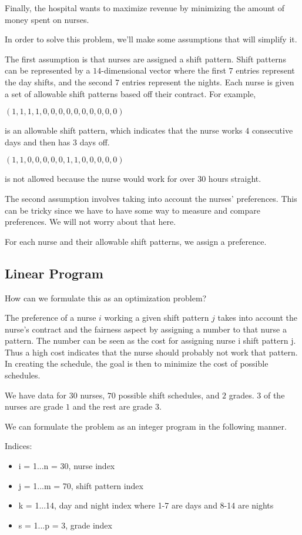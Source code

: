 Finally, the hospital wants to maximize revenue by minimizing the amount of money spent on nurses. 



In order to solve this problem, we'll make some assumptions that will simplify it. 

The first assumption is that nurses are assigned a shift pattern.
Shift patterns can be represented by a $14$-dimensional vector where the first $7$ entries represent the day shifts, and the second $7$ entries represent the nights.
Each nurse is given a set of allowable shift patterns based off their contract.
For example, 
\begin{center}
$(1,1,1,1,0,0,0,0,0,0,0,0,0,0)$
\end{center}
is an allowable shift pattern, which indicates that the nurse works $4$ consecutive days and then has $3$ days off. 
\begin{center}
$(1,1,0,0,0,0,0,1,1,0,0,0,0,0)$
\end{center}
is not allowed because the nurse would work for over $30$ hours straight.

The second assumption involves taking into account the nurses' preferences.
This can be tricky since we have to have some way to measure and compare preferences.
We will not worry about that here. 

For each nurse and their allowable shift patterns, we assign a preference.

\subsection*{Linear Program}
How can we formulate this as an optimization problem?

The preference of a nurse $i$ working a given shift pattern $j$ takes into account the nurse's contract and the fairness aspect by assigning a number to that nurse a pattern.
The number can be seen as the cost for assigning nurse i shift pattern j. 
Thus a high cost indicates that the nurse should probably not work that pattern.
In creating the schedule, the goal is then to minimize the cost of possible schedules. 


We have data for $30$ nurses, $70$ possible shift schedules, and $2$ grades.
$3$ of the nurses are grade $1$ and the rest are grade $3$. 

We can formulate the problem as an integer program in the following manner.


Indices:
\begin{itemize}
\item i = 1...n = 30, nurse index
\item j = 1...m = 70, shift pattern index
\item k = 1...14, day and night index where 1-7 are days and 8-14 are nights
\item s = 1...p = 3, grade index 
\end{itemize}

